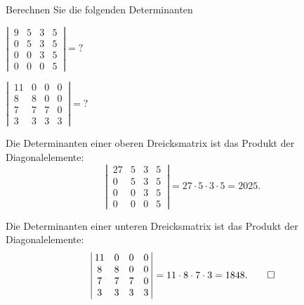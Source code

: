 Berechnen Sie die folgenden Determinanten
\begin{teilaufgaben}
\item
$
\left|\,\begin{matrix}
9&5&3&5\\
0&5&3&5\\
0&0&3&5\\
0&0&0&5
\end{matrix}\,\right|
=
\text{?}
$
\item
$
\left|\,\begin{matrix}
11&0&0&0\\
 8&8&0&0\\
 7&7&7&0\\
 3&3&3&3
\end{matrix}\,\right|
=
\text{?}
$
\end{teilaufgaben}

\begin{loesung}
\begin{teilaufgaben}
\item
Die Determinanten einer oberen Dreicksmatrix ist das Produkt der 
Diagonalelemente:
\[
\left|\,\begin{matrix}
27&5&3&5\\
0&5&3&5\\
0&0&3&5\\
0&0&0&5
\end{matrix}\,\right|
=
27\cdot 5\cdot 3 \cdot 5 
=
2025.
\]
\item
Die Determinanten einer unteren Dreicksmatrix ist das Produkt der 
Diagonalelemente:
\[
\left|\,\begin{matrix}
11&0&0&0\\
 8&8&0&0\\
 7&7&7&0\\
 3&3&3&3
\end{matrix}\,\right|
=
11\cdot 8 \cdot 7 \cdot 3 = 1848.
\qedhere
\]
\end{teilaufgaben}
\end{loesung}



